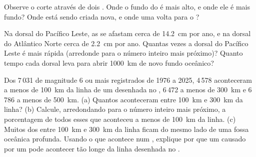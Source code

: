 \begin{exercise}[$\star\star$]\label{exo:g7:plate-tectonics:10}
Observe o corte através de dois . Onde o fundo do  é
mais alto, e onde ele é mais fundo? Onde está sendo criada  nova, e
onde uma  volta para o ?
\end{exercise}

\begin{exercise}[$\star\star\star$]\label{exo:g7:plate-tectonics:11}
Na dorsal do Pacífico Leste, as  se afastam cerca de \qty{14.2}{cm}
por ano, e na dorsal do Atlântico Norte cerca de \qty{2.2}{cm} por ano.
Quantas vezes a dorsal do Pacífico Leste é mais rápida (arredonde para o
número inteiro mais próximo)? Quanto tempo cada dorsal leva para abrir
\qty{1000}{km} de novo fundo oceânico?
\end{exercise}

\begin{exercise}[$\star\star\star$]\label{exo:g7:plate-tectonics:12}
Dos 7\,031  de magnitude 6 ou mais registrados de 1976 a 2025,
4\,578 aconteceram a menos de \qty{100}{km} da linha de um  desenhada no , 6\,472 a menos de \qty{300}{km} e 6\,786 a menos
de \qty{500}{km}.
(a) Quantos aconteceram entre \qty{100}{km} e \qty{300}{km} da linha?
(b) Calcule, arredondando para o número inteiro mais próximo, a
porcentagem de todos esses  que aconteceu a menos de
\qty{100}{km} da linha. (c) Muitos dos  entre \qty{100}{km} e
\qty{300}{km} da linha ficam do mesmo lado de uma fossa oceânica profunda.
Usando o que acontece num , explique por que um
 causado por um  pode acontecer tão longe da linha
desenhada no .
\end{exercise}

